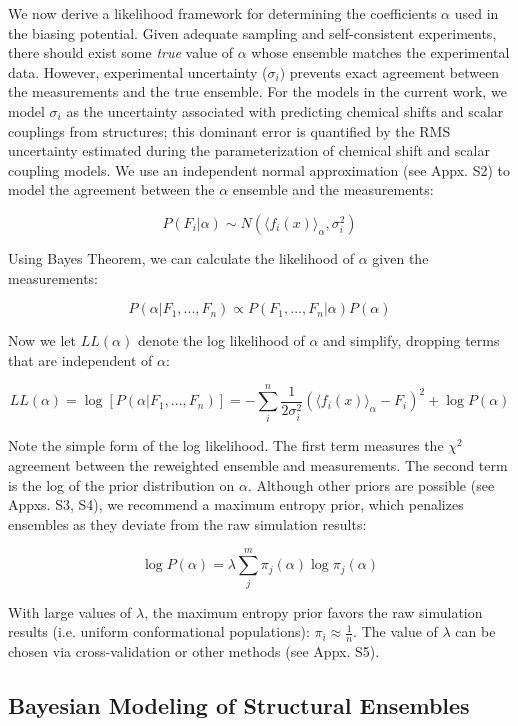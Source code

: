 \documentclass[journal=jacsat,manuscript=article]{achemso}
\begin{document}
We now derive a likelihood framework for determining the coefficients $\alpha$ used in the biasing potential.  Given adequate sampling and self-consistent experiments, there should exist some \emph{true} value of $\alpha$ whose ensemble matches the experimental data.  However, experimental uncertainty ($\sigma_i)$ prevents exact agreement between the measurements and the true ensemble.  For the models in the current work, we model $\sigma_i$ as the uncertainty associated with predicting chemical shifts and scalar couplings from structures; this dominant error is quantified by the RMS uncertainty estimated during the parameterization of chemical shift and scalar coupling models.  We use an independent normal approximation (see Appx. S2) to model the agreement between the $\alpha$ ensemble and the measurements:

$$P(F_i | \alpha) \sim N(\langle f_i(x)\rangle _\alpha, \sigma_i^2)$$

Using Bayes Theorem, we can calculate the likelihood of $\alpha$ given the measurements:

$$P(\alpha | F_1, ..., F_n) \propto P(F_1, ..., F_n | \alpha) P(\alpha)$$

Now we let $LL(\alpha)$ denote the log likelihood of $\alpha$ and simplify, dropping terms that are independent of $\alpha$:

$$LL(\alpha) = \log[ P(\alpha|F_1, ..., F_n)] = -\sum_i^n \frac{1}{2\sigma_i^2}(\langle f_i(x)\rangle _\alpha - F_i)^2 + \log P(\alpha)$$

Note the simple form of the log likelihood.  The first term measures the $\chi^2$ agreement between the reweighted ensemble and measurements.  The second term is the log of the prior distribution on $\alpha$.  Although other priors are possible (see Appxs. S3, S4), we recommend a maximum entropy prior, which penalizes ensembles as they deviate from the raw simulation results:

$$\log P(\alpha) = \lambda \sum_j^m \pi_j(\alpha) \log \pi_j(\alpha)$$

With large values of $\lambda$, the maximum entropy prior favors the raw simulation results (i.e. uniform conformational populations): $\pi_i \approx \frac{1}{n}$.  The value of $\lambda$ can be chosen via cross-validation or other methods (see Appx. S5).  

\subsection{Bayesian Modeling of Structural Ensembles}
\end{document}
